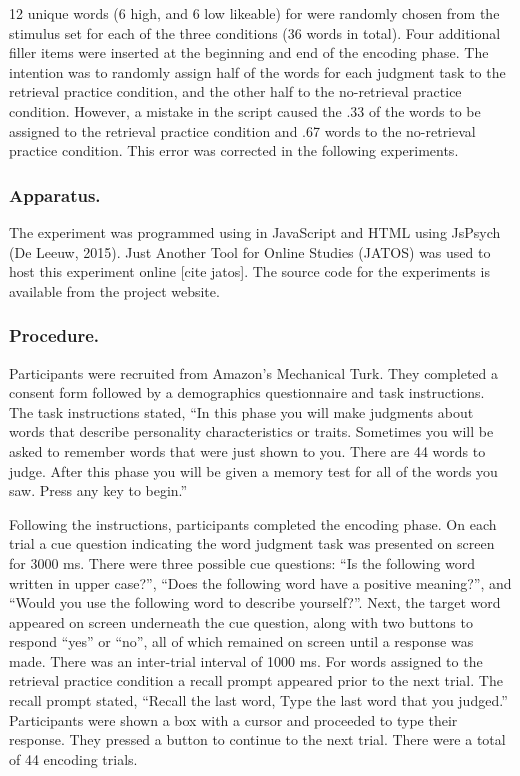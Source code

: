 \documentclass[
  man,floatsintext]{apa6}
\begin{document}
12 unique words (6 high, and 6 low likeable) for were randomly chosen from the stimulus set for each of the three conditions (36 words in total). Four additional filler items were inserted at the beginning and end of the encoding phase. The intention was to randomly assign half of the words for each judgment task to the retrieval practice condition, and the other half to the no-retrieval practice condition. However, a mistake in the script caused the .33 of the words to be assigned to the retrieval practice condition and .67 words to the no-retrieval practice condition. This error was corrected in the following experiments.

\hypertarget{apparatus.}{%
\subsubsection{Apparatus.}\label{apparatus.}}

The experiment was programmed using in JavaScript and HTML using JsPsych (De Leeuw, 2015). Just Another Tool for Online Studies (JATOS) was used to host this experiment online {[}cite jatos{]}. The source code for the experiments is available from the project website.

\hypertarget{procedure.}{%
\subsubsection{Procedure.}\label{procedure.}}

Participants were recruited from Amazon's Mechanical Turk. They completed a consent form followed by a demographics questionnaire and task instructions. The task instructions stated, ``In this phase you will make judgments about words that describe personality characteristics or traits. Sometimes you will be asked to remember words that were just shown to you. There are 44 words to judge. After this phase you will be given a memory test for all of the words you saw. Press any key to begin.''

Following the instructions, participants completed the encoding phase. On each trial a cue question indicating the word judgment task was presented on screen for 3000 ms. There were three possible cue questions: ``Is the following word written in upper case?'', ``Does the following word have a positive meaning?'', and ``Would you use the following word to describe yourself?''. Next, the target word appeared on screen underneath the cue question, along with two buttons to respond ``yes'' or ``no'', all of which remained on screen until a response was made. There was an inter-trial interval of 1000 ms. For words assigned to the retrieval practice condition a recall prompt appeared prior to the next trial. The recall prompt stated, ``Recall the last word, Type the last word that you judged.'' Participants were shown a box with a cursor and proceeded to type their response. They pressed a button to continue to the next trial. There were a total of 44 encoding trials.
\end{document}
